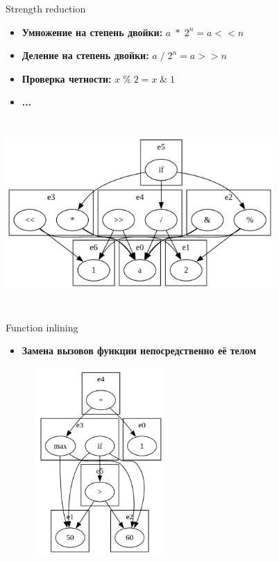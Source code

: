 \documentclass[aspectratio=169
  , xcolor={svgnames}
  , russian  %
  ]{beamer}
\begin{document}
\begin{frame}{Strength reduction}
    \begin{itemize}
    \item \textbf{\fontsize{14.1}{12} Умножение на степень двойки:} \textbf{\fontsize{14.1}{12} $a \; * \; 2^n = a << n$}
    \newline
    \item \textbf{\fontsize{14.1}{12} Деление на степень двойки:} \textbf{\fontsize{14.1}{12} $a \; / \;  2^n = a >> n$}
    \newline
    \item \textbf{\fontsize{14.1}{12} Проверка четности:} \textbf{\fontsize{14.1}{12} $x \; \% \; 2 = x \; \& \; 1$}
    \newline
    \item \textbf{\fontsize{14.1}{12} ...}
\end{itemize}
\end{frame}

\begin{frame}{}
    \centering
    \includegraphics[width=10.2cm, height=7.2cm]{misc/egraphs_images/strength_red.jpeg}
\end{frame}

\begin{frame}{Function inlining}
    \begin{itemize}
    \item \textbf{\fontsize{14.1}{12} Замена вызовов функции непосредственно её телом}

\end{itemize}
\end{frame}

\begin{frame}{}
    \centering
    \includegraphics[width=7.2cm, height=7.2cm]{misc/egraphs_images/inlining_demo.jpeg}
\end{frame}
\end{document}
